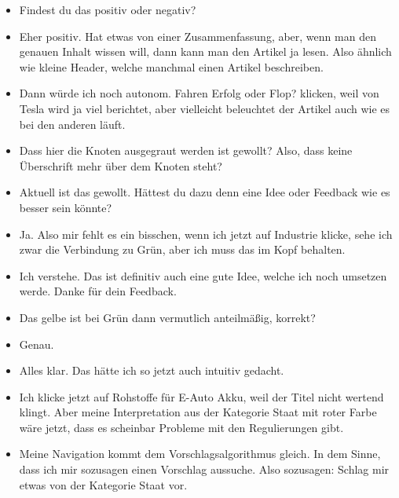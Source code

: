 {\begin{itemize}[]
                  Also, wenn ich mich richtig erinnere stand nämlich Industrie für Effizienz und hier ist die Kategorie grün.
                  Das nimmt allerdings auch etwas Inhalt vorweg.
            \item {} Findest du das positiv oder negativ?
            \item {} Eher positiv.
                  Hat etwas von einer Zusammenfassung, aber, wenn man den genauen Inhalt wissen will, dann kann man den Artikel ja lesen.
                  Also ähnlich wie kleine Header, welche manchmal einen Artikel beschreiben.
            \item {} Dann würde ich noch \flqq autonom. Fahren Erfolg oder Flop?\frqq{} klicken, weil von Tesla wird ja viel berichtet, aber vielleicht beleuchtet der Artikel auch wie es bei den anderen läuft.
            \item {} Dass hier die Knoten ausgegraut werden ist gewollt?
                  Also, dass keine Überschrift mehr über dem Knoten steht?
            \item {} Aktuell ist das gewollt. Hättest du dazu denn eine Idee oder Feedback wie es besser sein könnte?
            \item {} Ja. Also mir fehlt es ein bisschen, wenn ich jetzt auf Industrie klicke, sehe ich zwar die Verbindung zu Grün, aber ich muss das im Kopf behalten.
            \item {} Ich verstehe. Das ist definitiv auch eine gute Idee, welche ich noch umsetzen werde. Danke für dein Feedback.
            \item {} Das gelbe ist bei Grün dann vermutlich anteilmäßig, korrekt?
            \item {} Genau.
            \item {} Alles klar. Das hätte ich so jetzt auch intuitiv gedacht.
            \item {} Ich klicke jetzt auf \flqq Rohstoffe für E-Auto Akku\frqq{}, weil der Titel nicht wertend klingt.
                  Aber meine Interpretation aus der Kategorie Staat mit roter Farbe wäre jetzt, dass es scheinbar Probleme mit den Regulierungen gibt.
            \item {} Meine Navigation kommt dem Vorschlagsalgorithmus gleich.
                  In dem Sinne, dass ich mir sozusagen einen Vorschlag aussuche.
                  Also sozusagen: Schlag mir etwas von der Kategorie Staat vor.

\end{itemize}}

